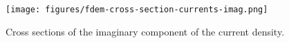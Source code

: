 \begin{figure}
    \begin{center}
    \texttt{[image: figures/fdem-cross-section-currents-imag.png]}
    \end{center}
\caption{
    Cross sections of the imaginary component of the current density.
}
\label{fig:fdem-cross-section-currents-imag}
\end{figure}



